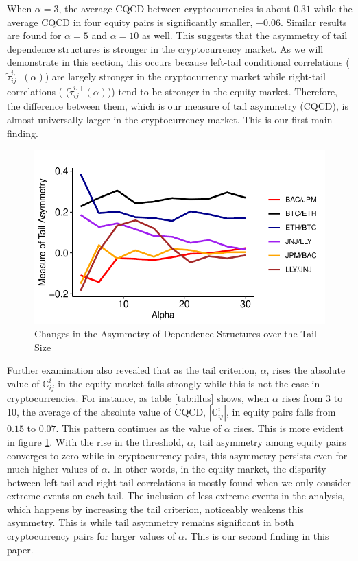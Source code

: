 \documentclass{article}
\begin{document}
When $\alpha = 3$, the average CQCD between cryptocurrencies is about $0.31$ while the average  CQCD in four equity pairs is significantly smaller, $-0.06$. Similar results are found for $\alpha = 5$ and $\alpha = 10$ as well. This suggests that the asymmetry of tail dependence structures is stronger in the cryptocurrency market. As we will demonstrate in this section, this occurs because left-tail conditional correlations ($\tilde{\tau}^{i,-}_{ij}(\alpha)$) are largely stronger in the cryptocurrency market while right-tail correlations ( ($\tilde{\tau}^{i,+}_{ij}(\alpha)$)) tend to be stronger in the equity market. Therefore, the difference between them, which is our measure of tail asymmetry (CQCD), is almost universally larger in the cryptocurrency market. This is our first main finding.\par 

\begin{figure}[H]
\centering
\includegraphics[width=0.55\linewidth]{Figures/6 pairs C-alpha.pdf}
\caption{Changes in the Asymmetry of Dependence Structures over the Tail Size}
\label{fig:fig1}
\end{figure}


Further examination also revealed that as the tail criterion, $\alpha$, rises the absolute value of $\mathbb{C}^i_{ij}$ in the equity market falls strongly while this is not the case in  cryptocurrencies. For instance, as table \ref{tab:illus} shows, when $\alpha$ rises from 3 to 10, the average of the absolute value of CQCD, $|\mathbb{C}^i_{ij}|$, in equity pairs falls from $0.15$ to $0.07$. This pattern continues as the value of $\alpha$ rises. This is more evident in figure \ref{fig:fig1}. With the rise in the threshold, $\alpha$, tail asymmetry among equity pairs converges to zero while in cryptocurrency pairs, this asymmetry persists even for much higher values of $\alpha$. In other words, in the equity market, the disparity between left-tail and right-tail correlations is mostly found when we only consider extreme events on each tail. The inclusion of less extreme events in the analysis, which happens by increasing the tail criterion, noticeably weakens this asymmetry. This is while tail asymmetry remains significant in both cryptocurrency pairs for larger values of $\alpha$. This is our second finding in this paper.
\end{document}
